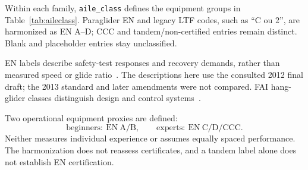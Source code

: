 Within each family, \texttt{aile\_class} defines the equipment groups in
Table~\ref{tab:aileclass}. Paraglider EN and legacy LTF codes, such as
\enquote{C ou 2}, are harmonized as EN A--D; CCC and tandem/non-certified entries
remain distinct. Blank and placeholder entries stay unclassified.

EN labels describe safety-test responses and recovery demands, rather than
measured speed or glide ratio~\cite{fpren926_2_2012}. The descriptions here use
the consulted 2012 final draft; the 2013 standard and later amendments were not
compared. FAI hang-glider classes distinguish design and control
systems~\cite{fai_sc7_2024}.

Two operational equipment proxies are defined:
\[
 \text{beginners}:\ \mathrm{EN\ A/B},\qquad
 \text{experts}:\ \mathrm{EN\ C/D/CCC}.
\]
Neither measures individual experience or assumes equally spaced performance.
The harmonization does not reassess certificates, and a tandem label alone does
not establish EN certification.

